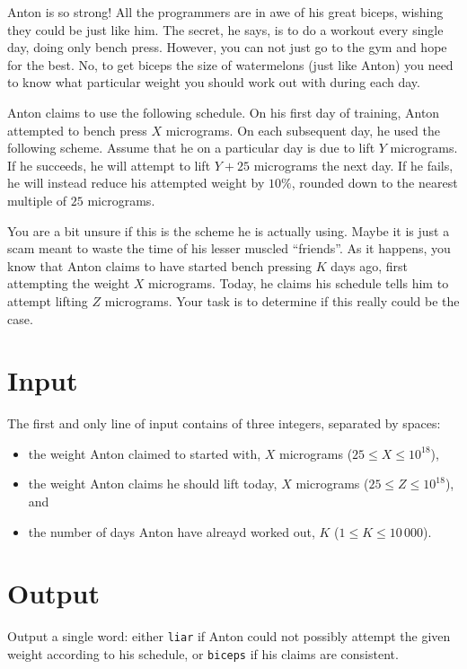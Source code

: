 Anton is so strong!
All the programmers are in awe of his great biceps, wishing they could be just like him.
The secret, he says, is to do a workout every single day, doing only bench press.
However, you can not just go to the gym and hope for the best.
No, to get biceps the size of watermelons (just like Anton) you need to know what particular weight you should work out with during each day.

Anton claims to use the following schedule.
On his first day of training, Anton attempted to bench press $X$ micrograms.
On each subsequent day, he used the following scheme.
Assume that he on a particular day is due to lift $Y$ micrograms.
If he succeeds, he will attempt to lift $Y + 25$ micrograms the next day.
If he fails, he will instead reduce his attempted weight by $10\%$, rounded down to the nearest multiple of $25$ micrograms.

You are a bit unsure if this is the scheme he is actually using.
Maybe it is just a scam meant to waste the time of his lesser muscled ``friends''.
As it happens, you know that Anton claims to have started bench pressing $K$ days ago, first attempting the weight $X$ micrograms.
Today, he claims his schedule tells him to attempt lifting $Z$ micrograms.
Your task is to determine if this really could be the case.

\section*{Input}
The first and only line of input contains of three integers, separated by spaces:
\begin{itemize}
\item the weight Anton claimed to started with, $X$ micrograms ($25 \le X \le 10^{18}$),
\item the weight Anton claims he should lift today, $X$ micrograms ($25 \le Z \le 10^{18}$), and
\item the number of days Anton have alreayd worked out, $K$ ($1 \le K \le 10\,000$).
\end{itemize}

\section*{Output}
Output a single word: either \texttt{liar} if Anton could not possibly attempt the given weight according to his schedule, or \texttt{biceps} if his claims are consistent.
